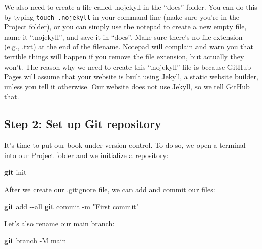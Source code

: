 \documentclass[
]{book}
\newenvironment{Shaded}{\begin{snugshade}}{\end{snugshade}}
\newcommand{\AttributeTok}[1]{\textcolor[rgb]{0.13,0.29,0.53}{#1}}
\newcommand{\FunctionTok}[1]{\textcolor[rgb]{0.13,0.29,0.53}{\textbf{#1}}}
\newcommand{\NormalTok}[1]{#1}
\newcommand{\StringTok}[1]{\textcolor[rgb]{0.31,0.60,0.02}{#1}}
\begin{document}
We also need to create a file called .nojekyll in the ``docs'' folder. You can do this by typing \texttt{touch\ .nojekyll} in your command line (make sure you're in the Project folder), or you can simply use the notepad to create a new empty file, name it ``.nojekyll'', and save it in ``docs''. Make sure there's no file extension (e.g., .txt) at the end of the filename. Notepad will complain and warn you that terrible things will happen if you remove the file extension, but actually they won't. The reason why we need to create this ``.nojekyll'' file is because GitHub Pages will assume that your website is built using Jekyll, a static website builder, unless you tell it otherwise. Our website does not use Jekyll, so we tell GitHub that.

\hypertarget{step-2-set-up-git-repository}{%
\subsection{Step 2: Set up Git repository}\label{step-2-set-up-git-repository}}

It's time to put our book under version control. To do so, we open a terminal into our Project folder and we initialize a repository:

\begin{Shaded}
\begin{Highlighting}[]

\FunctionTok{git}\NormalTok{ init}
\end{Highlighting}
\end{Shaded}

After we create our .gitignore file, we can add and commit our files:

\begin{Shaded}
\begin{Highlighting}[]

\FunctionTok{git}\NormalTok{ add }\AttributeTok{{-}{-}all}
\FunctionTok{git}\NormalTok{ commit }\AttributeTok{{-}m} \StringTok{"First commit"}
\end{Highlighting}
\end{Shaded}

Let's also rename our main branch:

\begin{Shaded}
\begin{Highlighting}[]

\FunctionTok{git}\NormalTok{ branch }\AttributeTok{{-}M}\NormalTok{ main}
\end{Highlighting}
\end{Shaded}
\end{document}
